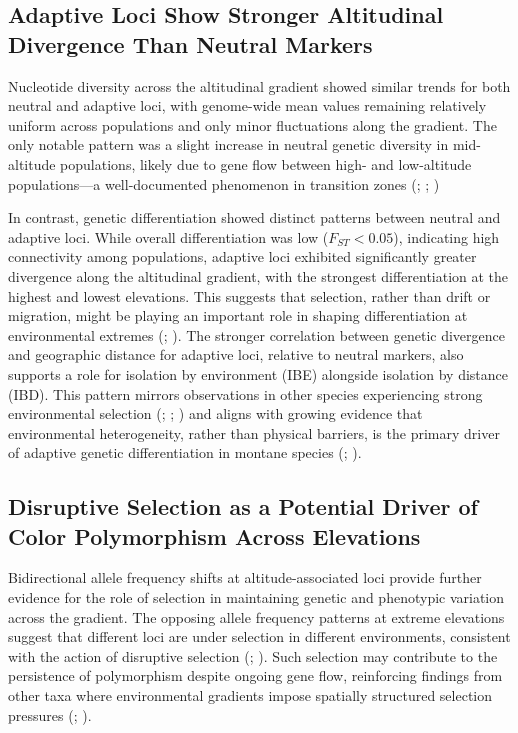 \documentclass[9pt,a4paper,twoside]{rho-class/rho}
\begin{document}
    \subsection{Adaptive Loci Show Stronger Altitudinal Divergence Than Neutral Markers}

    Nucleotide diversity across the altitudinal gradient showed similar trends for both neutral and adaptive loci, with genome-wide mean values remaining relatively uniform across populations and only minor fluctuations along the gradient. The only notable pattern was a slight increase in neutral genetic diversity in mid-altitude populations, likely due to gene flow between high- and low-altitude populations—a well-documented phenomenon in transition zones (\cite{Byars2009}; \cite{Polato2017}; \cite{Cortázar-Chinarro2017})

    In contrast, genetic differentiation showed distinct patterns between neutral and adaptive loci. While overall differentiation was low ($F_{ST} < 0.05$), indicating high connectivity among populations, adaptive loci exhibited significantly greater divergence along the altitudinal gradient, with the strongest differentiation at the highest and lowest elevations. This  suggests that selection, rather than drift or migration, might be playing an important role in shaping differentiation at environmental extremes (\cite{Raeymaekers2017}; \cite{Cortázar-Chinarro2017}). The stronger correlation between genetic divergence and geographic distance for adaptive loci, relative to neutral markers, also supports a role for isolation by environment (IBE) alongside isolation by distance (IBD). This pattern mirrors observations in other species experiencing strong environmental selection (\cite{Jiang2019}; \cite{Wagutu2022}; \cite{Wakamiya2023}) and aligns with growing evidence that environmental heterogeneity, rather than physical barriers, is the primary driver of adaptive genetic differentiation in montane species (\cite{Zancolli2019}; \cite{Wagutu2022}).

    \subsection{Disruptive Selection as a Potential Driver of Color Polymorphism Across Elevations}

    Bidirectional allele frequency shifts at altitude-associated loci provide further evidence for the role of selection in maintaining genetic and phenotypic variation across the gradient. The opposing allele frequency patterns at extreme elevations suggest that different loci are under selection in different environments, consistent with the action of disruptive selection (\cite{White2021}; \cite{Wadgymar2022}). Such selection may contribute to the persistence of polymorphism despite ongoing gene flow, reinforcing findings from other taxa where environmental gradients impose spatially structured selection pressures (\cite{Tigano2016}; \cite{Zancolli2019}).
\end{document}
